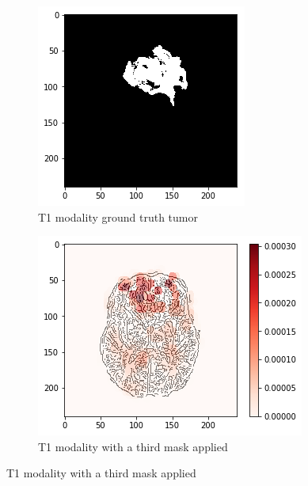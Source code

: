 \begin{figure}[H]
\begin{subfigure}[t]{.215\textwidth}
        \includegraphics[width=\linewidth]{chapters/06_hdm/c_Brats18_2013_17_1_L1/40.png}
        \caption{T1 modality ground truth tumor}
    \end{subfigure}
    \begin{subfigure}[t]{.27\textwidth}
        \centering
        \includegraphics[width=\linewidth]{chapters/06_hdm/c_Brats18_2013_17_1_L1/43.png}
        \caption{T1 modality with a third mask applied}
    \end{subfigure}

\end{figure}
